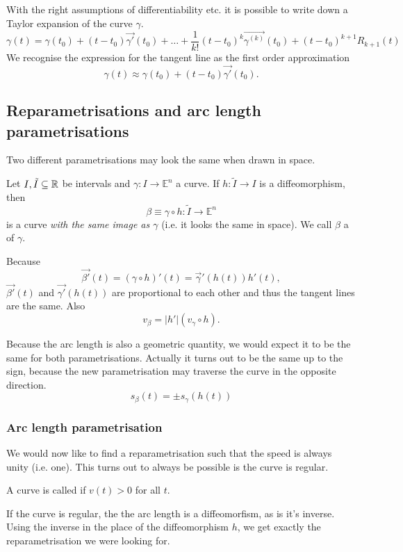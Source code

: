 \begin{note}
With the right assumptions of differentiability etc. it is possible to write down a Taylor expansion of the curve $\gamma$.
\[ \gamma(t) = \gamma(t_0) + (t-t_0)\vec{\gamma'}(t_0) + \ldots + \frac{1}{k!}(t-t_0)^k\vec{\gamma^{(k)}}(t_0) + (t-t_0)^{k+1}R_{k+1}(t) \]
We recognise the expression for the tangent line as the first order approximation
\[ \gamma(t) \approx \gamma(t_0) + (t-t_0)\vec{\gamma'}(t_0). \]
\end{note}

\subsection{Reparametrisations and arc length parametrisations}
Two different parametrisations may look the same when drawn in space.

\begin{definition}
Let $I, \tilde{I} \subseteq \mathbb{R}$ be intervals and $\gamma: I \to \mathbb{E}^n$ a curve.
If $h: \tilde{I} \to I$ is a diffeomorphism, then 
\[ \beta \equiv \gamma \circ h: \tilde{I} \to \mathbb{E}^n \]
is a curve \textit{with the same image as $\gamma$} (i.e. it looks the same in space). We call $\beta$ a  of $\gamma$.
\end{definition}
Because
\[ \vec{\beta'}(t) = (\gamma\circ h)'(t) = \vec{\gamma}'(h(t))h'(t), \]
$\vec{\beta'}(t)$ and $\vec{\gamma'}(h(t))$ are proportional to each other and thus the tangent lines are the same. Also
\[ v_\beta = |h'|(v_\gamma\circ h). \]

Because the arc length is also a geometric quantity, we would expect it to be the same for both parametrisations. Actually it turns out to be the same up to the sign, because the new parametrisation may traverse the curve in the opposite direction.
\[ s_\beta(t) = \pm s_\gamma(h(t)) \]

\subsubsection{Arc length parametrisation}
We would now like to find a reparametrisation such that the speed is always unity (i.e. one). This turns out to always be possible is the curve is regular.
\begin{definition}
A curve is called  if $v(t) > 0$ for all $t$.
\end{definition}

If the curve is regular, the the arc length is a diffeomorfism, as is it's inverse. Using the inverse in the place of the diffeomorphism $h$, we get exactly the reparametrisation we were looking for.

